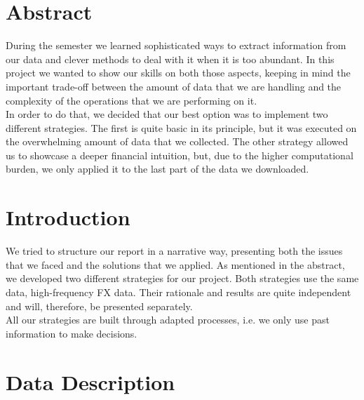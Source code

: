 \documentclass[a4paper]{article}
\begin{document}
\newpage
\tableofcontents

\newpage



\section{Abstract}

During the semester we learned sophisticated ways to extract information from our data and clever methods to deal with it when it is too abundant. In this project we wanted to show our skills on both those aspects, keeping in mind the important trade-off between the amount of data that we are handling and the complexity of the operations that we are performing on it.\\
In order to do that, we decided that our best option was to implement two different strategies. The first is quite basic in its principle, but it was executed on the overwhelming amount of data that we collected. The other strategy allowed us to showcase a deeper financial intuition, but, due to the higher computational burden, we only applied it to the last part of the data we downloaded.


\section{Introduction}

We tried to structure our report in a narrative way, presenting both the issues that we faced and the solutions that we applied. As mentioned in the abstract, we developed two different strategies for our project. Both strategies use the same data, high-frequency FX data. Their rationale and results are quite independent and will, therefore, be presented separately.\\
All our strategies are built through adapted processes, i.e. we only use past information to make decisions.\\ 


\section{Data Description}
\end{document}
